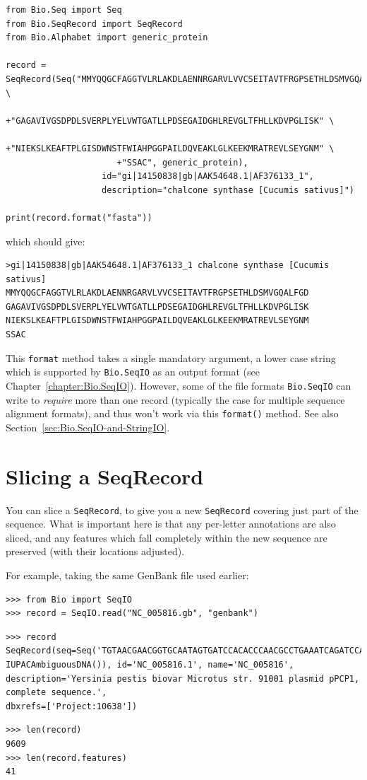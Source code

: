 \documentclass{report}
\begin{document}
\begin{verbatim}
from Bio.Seq import Seq
from Bio.SeqRecord import SeqRecord
from Bio.Alphabet import generic_protein

record = SeqRecord(Seq("MMYQQGCFAGGTVLRLAKDLAENNRGARVLVVCSEITAVTFRGPSETHLDSMVGQALFGD" \
                      +"GAGAVIVGSDPDLSVERPLYELVWTGATLLPDSEGAIDGHLREVGLTFHLLKDVPGLISK" \
                      +"NIEKSLKEAFTPLGISDWNSTFWIAHPGGPAILDQVEAKLGLKEEKMRATREVLSEYGNM" \
                      +"SSAC", generic_protein),
                   id="gi|14150838|gb|AAK54648.1|AF376133_1",
                   description="chalcone synthase [Cucumis sativus]")
                   
print(record.format("fasta"))
\end{verbatim}
\noindent which should give:
\begin{verbatim}
>gi|14150838|gb|AAK54648.1|AF376133_1 chalcone synthase [Cucumis sativus]
MMYQQGCFAGGTVLRLAKDLAENNRGARVLVVCSEITAVTFRGPSETHLDSMVGQALFGD
GAGAVIVGSDPDLSVERPLYELVWTGATLLPDSEGAIDGHLREVGLTFHLLKDVPGLISK
NIEKSLKEAFTPLGISDWNSTFWIAHPGGPAILDQVEAKLGLKEEKMRATREVLSEYGNM
SSAC
\end{verbatim}

This \verb|format| method takes a single mandatory argument, a lower case string which is
supported by \verb|Bio.SeqIO| as an output format (see Chapter~\ref{chapter:Bio.SeqIO}).
However, some of the file formats \verb|Bio.SeqIO| can write to \emph{require} more than
one record (typically the case for multiple sequence alignment formats), and thus won't
work via this \verb|format()| method.  See also Section~\ref{sec:Bio.SeqIO-and-StringIO}.

\section{Slicing a SeqRecord}
\label{sec:SeqRecord-slicing}

You can slice a \verb|SeqRecord|, to give you a new \verb|SeqRecord| covering just
part of the sequence. What is important
here is that any per-letter annotations are also sliced, and any features which fall
completely within the new sequence are preserved (with their locations adjusted).

For example, taking the same GenBank file used earlier:

\begin{verbatim}
>>> from Bio import SeqIO
>>> record = SeqIO.read("NC_005816.gb", "genbank")
\end{verbatim}
\begin{verbatim}
>>> record
SeqRecord(seq=Seq('TGTAACGAACGGTGCAATAGTGATCCACACCCAACGCCTGAAATCAGATCCAGG...CTG',
IUPACAmbiguousDNA()), id='NC_005816.1', name='NC_005816',
description='Yersinia pestis biovar Microtus str. 91001 plasmid pPCP1, complete sequence.',
dbxrefs=['Project:10638'])
\end{verbatim}
\begin{verbatim}
>>> len(record)
9609
>>> len(record.features)
41
\end{verbatim}
\end{document}
